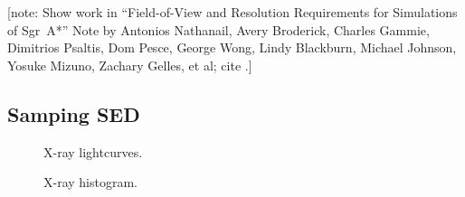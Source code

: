 \documentclass[twocolumn,tighten,dvipsnames,linenumbers]{aastex63}
\newcommand\note[1]{{\color{OliveGreen}[note: #1]}}
\begin{document}
\note{Show work in ``Field-of-View and Resolution Requirements for
  Simulations of Sgr~A*'' Note by Antonios Nathanail, Avery Broderick,
  Charles Gammie, Dimitrios Psaltis, Dom Pesce, George Wong, Lindy
  Blackburn, Michael Johnson, Yosuke Mizuno, Zachary Gelles, et al;
  cite \citet{2020arXiv200406210P}.}

\subsection{Samping SED}
\label{sec:sed-sample}

\begin{figure}
  \caption{X-ray lightcurves.}
  \label{fig:lc}
\end{figure}

\begin{figure}
  \caption{X-ray histogram.}
  \label{fig:hist}
\end{figure}






\end{document}
